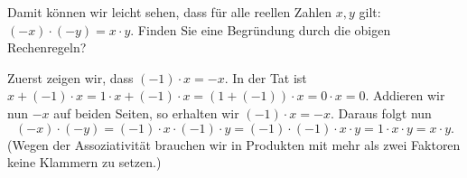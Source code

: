 \documentclass{ximera}
\begin{document}
\begin{exercise}
Damit können wir leicht sehen, dass für alle reellen Zahlen $x,y$ gilt: $(-x)\cdot (-y) = x\cdot y$. Finden Sie eine Begründung durch die obigen Rechenregeln?
\begin{solution}
Zuerst zeigen wir, dass $(-1)\cdot x = -x$. In der Tat ist $x + (-1)\cdot x = 1\cdot x + (-1)\cdot x = (1+(-1))\cdot x = 0\cdot x = 0$. Addieren wir nun $-x$ auf beiden Seiten, so erhalten wir $(-1)\cdot x = -x$.
Daraus folgt nun
\[
(-x)\cdot (-y) = (-1)\cdot x \cdot (-1) \cdot y = (-1)\cdot (-1)\cdot x\cdot y = 1\cdot x\cdot y = x\cdot y.
\]
(Wegen der Assoziativität brauchen wir in Produkten mit mehr als zwei Faktoren keine Klammern zu setzen.)
\end{solution}
\end{exercise}
\end{document}
